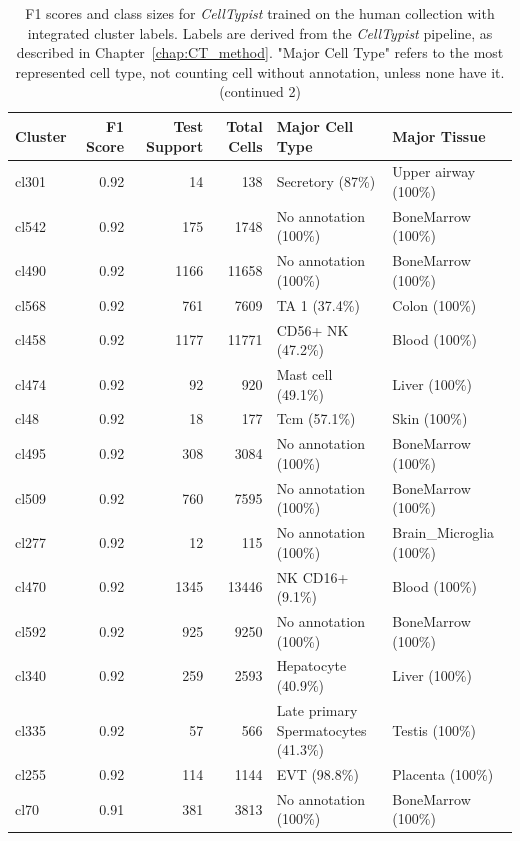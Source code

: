 \begin{table}[ht!]
\scriptsize
\caption[F1 scores and class sizes for \textit{CellTypist} trained on the human collection with integrated cluster labels (continued 2)]{F1 scores and class sizes for \textit{CellTypist} trained on the human collection with integrated cluster labels. Labels are derived from the \textit{CellTypist} pipeline, as described in Chapter~\ref{chap:CT_method}. "Major Cell Type" refers to the most represented cell type, not counting cell without annotation, unless none have it. (continued 2)}
\centering
\label{table:tab_HAmodelclust2}
\begin{tabular}{lrrrll}
  \toprule
Cluster & F1 Score & Test Support & Total Cells & Major Cell Type & Major Tissue \\ 
  \midrule
  cl301 & 0.92 &  14 & 138 & Secretory (87\%) & Upper airway (100\%) \\ 
  cl542 & 0.92 & 175 & 1748 & No annotation (100\%) & BoneMarrow (100\%) \\ 
  cl490 & 0.92 & 1166 & 11658 & No annotation (100\%) & BoneMarrow (100\%) \\ 
  cl568 & 0.92 & 761 & 7609 & TA 1 (37.4\%) & Colon (100\%) \\ 
  cl458 & 0.92 & 1177 & 11771 & CD56+ NK (47.2\%) & Blood (100\%) \\ 
  cl474 & 0.92 &  92 & 920 & Mast cell (49.1\%) & Liver (100\%) \\ 
  cl48 & 0.92 &  18 & 177 & Tcm (57.1\%) & Skin (100\%) \\ 
  cl495 & 0.92 & 308 & 3084 & No annotation (100\%) & BoneMarrow (100\%) \\ 
  cl509 & 0.92 & 760 & 7595 & No annotation (100\%) & BoneMarrow (100\%) \\ 
  cl277 & 0.92 &  12 & 115 & No annotation (100\%) & Brain\_Microglia (100\%) \\ 
  cl470 & 0.92 & 1345 & 13446 & NK CD16+ (9.1\%) & Blood (100\%) \\ 
  cl592 & 0.92 & 925 & 9250 & No annotation (100\%) & BoneMarrow (100\%) \\ 
  cl340 & 0.92 & 259 & 2593 & Hepatocyte (40.9\%) & Liver (100\%) \\ 
  cl335 & 0.92 &  57 & 566 & \specialcell[t]{Late primary\\Spermatocytes (41.3\%)} & Testis (100\%) \\ 
  cl255 & 0.92 & 114 & 1144 & EVT (98.8\%) & Placenta (100\%) \\ 
  cl70 & 0.91 & 381 & 3813 & No annotation (100\%) & BoneMarrow (100\%) \\ 

\end{tabular}
\end{table}
